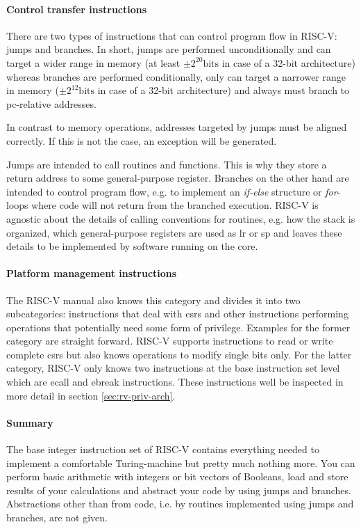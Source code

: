 \paragraph{Control transfer instructions}
There are two types of instructions that can control program flow in RISC-V: jumps and branches.
In short, jumps are performed unconditionally and can target a wider range in memory (at least $ \pm 2^{20}\text{bits} $ in case of a 32-bit architecture) whereas branches are performed conditionally, only can target a narrower range in memory ($ \pm 2^{12}\text{bits} $ in case of a 32-bit architecture) and always must branch to \gls{pc}-relative addresses.

In contrast to memory operations, addresses targeted by jumps must be aligned correctly.
If this is not the case, an exception will be generated.

Jumps are intended to call routines and functions.
This is why they store a return address to some general-purpose register.
Branches on the other hand are intended to control program flow, e.g. to implement an \textit{if-else} structure or \textit{for}-loops where code will not return from the branched execution.
RISC-V is agnostic about the details of calling conventions for routines, e.g. how the stack is organized, which general-purpose registers are used as \gls{lr} or \gls{sp} and leaves these details to be implemented by software running on the core.

\paragraph{Platform management instructions}
The RISC-V manual also knows this category and divides it into two subcategories: instructions that deal with \glspl{csr} and other instructions performing operations that potentially need some form of privilege.
Examples for the former category are straight forward.
RISC-V supports instructions to read or write complete \glspl{csr} but also knows operations to modify single bits only.
For the latter category, RISC-V only knows two instructions at the base instruction set level which are \gls{ecall} and \gls{ebreak} instructions.
These instructions well be inspected in more detail in section \ref{sec:rv-priv-arch}.

\paragraph{Summary}
The base integer instruction set of RISC-V contains everything needed to implement a comfortable Turing-machine but pretty much nothing more.
You can perform basic arithmetic with integers or bit vectors of Booleans, load and store results of your calculations and abstract your code by using jumps and branches.
Abstractions other than from code, i.e. by routines implemented using jumps and branches, are not given.

